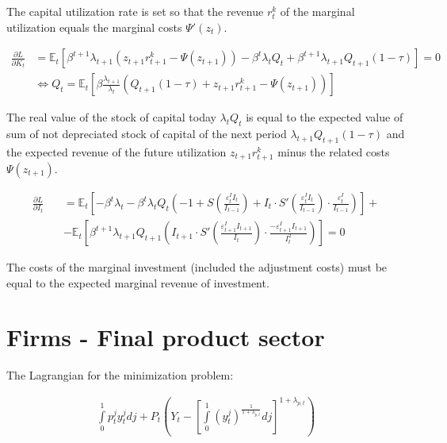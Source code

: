 \documentclass{pracamgr}
\numberwithin{equation}{section}
\begin{document}
The capital utilization rate is set so that the revenue $r_{t}^{k}$ of the marginal utilization equals the marginal costs $\Psi'(z_{t})$.

\begin{align}
\frac{\partial L}{\partial K_{t}} &= \mathbb{E}_{t} \left[ \beta^{t+1} \lambda_{t+1} \left( z_{t+1}r_{t+1}^{k} - \Psi(z_{t+1}) \right) - \beta^{t} \lambda_{t}Q_{t} + \beta^{t+1} \lambda_{t+1}Q_{t+1}(1-\tau) \right] = 0 \nonumber \\
& \iff Q_{t} = \mathbb{E}_{t} \left[ \beta \frac{\lambda_{t+1}}{\lambda_{t}} \left( Q_{t+1}(1-\tau) + z_{t+1}r_{t+1}^{k} - \Psi(z_{t+1}) \right) \right]
\end{align}

The real value of the stock of capital today $\lambda_{t} Q_{t}$ is equal to the expected value of sum of not depreciated stock of capital of the next period $\lambda_{t+1}Q_{t+1}(1-\tau)$ and the expected revenue of the future utilization $ z_{t+1}r_{t+1}^{k}$ minus the related costs $\Psi(z_{t+1})$.

\begin{align}
\frac{\partial L}{\partial I_{t}} &= \mathbb{E}_{t} \left[ -\beta^{t} \lambda_{t} - \beta^{t} \lambda_{t} Q_{t} \left(-1 + S\left(\frac{\varepsilon_{t}^{I}I_{t}}{I_{t-1}} \right) + I_{t} \cdot S' \left(\frac{\varepsilon_{t}^{I}I_{t}}{I_{t-1}} \right) \cdot \frac{\varepsilon_{t}^{I}}{I_{t-1}} \right) \right] + \nonumber \\
\qquad &- \mathbb{E}_{t} \left[ \beta^{t+1} \lambda_{t+1} Q_{t+1} \left(I_{t+1} \cdot S' \left(\frac{\varepsilon_{t+1}^{I}I_{t+1}}{I_{t}} \right) \cdot \frac{-\varepsilon_{t+1}^{I}I_{t+1}}{I_{t}^{2}} \right) \right] = 0
\end{align}

The costs of the marginal investment (included the adjustment costs) must be equal to the expected marginal revenue of investment.

\section*{Firms - Final product sector}

The Lagrangian for the minimization problem:

\begin{align}
\int\limits_{0}^{1} p_{t}^{j} y_{t}^{j}dj + P_{t} \left( Y_{t} - \left[ \int\limits_{0}^{1} \left(y_{t}^{j} \right)^\frac{1}{1+\lambda_{p,t}} dj \right]^{1+\lambda_{p,t}} \right)
\end{align}
\end{document}
